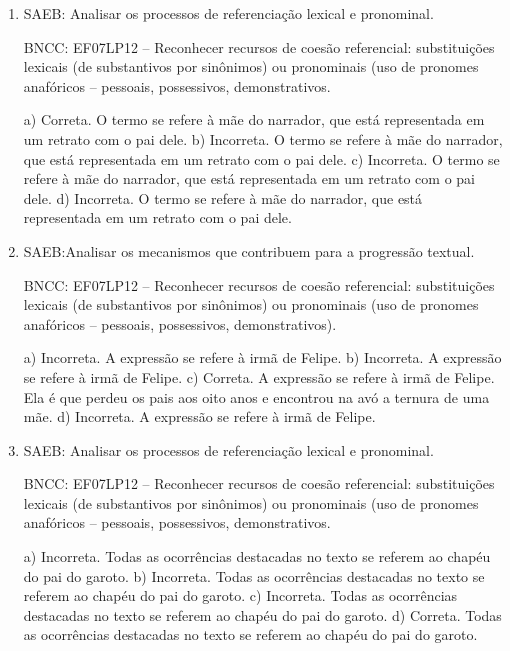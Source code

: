 
\begin{enumerate}

\item
SAEB: Analisar os processos de referenciação lexical e pronominal.

BNCC: EF07LP12 -- Reconhecer recursos de coesão referencial:
substituições lexicais (de substantivos por sinônimos) ou pronominais
(uso de pronomes anafóricos -- pessoais, possessivos, demonstrativos.

a) Correta. O termo se refere à mãe do narrador, que está representada em um retrato com o pai dele.
b) Incorreta. O termo se refere à mãe do narrador, que está representada em um retrato com o pai dele.
c) Incorreta. O termo se refere à mãe do narrador, que está representada em um retrato com o pai dele.
d) Incorreta. O termo se refere à mãe do narrador, que está representada em um retrato com o pai dele.

\item
SAEB:Analisar os mecanismos que contribuem para a progressão textual.

BNCC: EF07LP12 -- Reconhecer recursos de coesão referencial:
substituições lexicais (de substantivos por sinônimos) ou pronominais
(uso de pronomes anafóricos -- pessoais, possessivos, demonstrativos).

a) Incorreta. A expressão se refere à irmã de Felipe.
b) Incorreta. A expressão se refere à irmã de Felipe.
c) Correta. A expressão se refere à irmã de Felipe. Ela é que perdeu os pais aos oito anos e encontrou na avó a ternura de uma mãe.
d) Incorreta. A expressão se refere à irmã de Felipe.

\item
SAEB: Analisar os processos de referenciação lexical e pronominal.

BNCC: EF07LP12 -- Reconhecer recursos de coesão referencial:
substituições lexicais (de substantivos por sinônimos) ou pronominais
(uso de pronomes anafóricos -- pessoais, possessivos, demonstrativos.

a) Incorreta. Todas as ocorrências destacadas no texto se referem ao chapéu do pai do garoto. 
b) Incorreta. Todas as ocorrências destacadas no texto se referem ao chapéu do pai do garoto. 
c) Incorreta. Todas as ocorrências destacadas no texto se referem ao chapéu do pai do garoto. 
d) Correta. Todas as ocorrências destacadas no texto se referem ao chapéu do pai do garoto. 

\end{enumerate}

